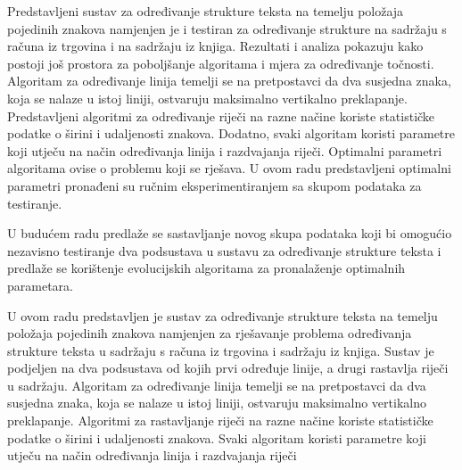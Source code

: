 \documentclass[times, utf8, zavrsni]{fer}
\begin{document}
Predstavljeni sustav za određivanje strukture teksta na temelju položaja
pojedinih znakova namjenjen je i testiran za određivanje strukture na sadržaju s
računa iz trgovina i na sadržaju iz knjiga. Rezultati i analiza pokazuju kako
postoji još prostora za poboljšanje algoritama i mjera za određivanje
točnosti. Algoritam za određivanje linija temelji se na pretpostavci da dva
susjedna znaka, koja se nalaze u istoj liniji, ostvaruju maksimalno vertikalno
preklapanje. Predstavljeni algoritmi za određivanje riječi na razne načine
koriste statističke podatke o širini i udaljenosti znakova. Dodatno,
svaki algoritam koristi parametre koji utječu na način određivanja linija i
razdvajanja riječi. Optimalni parametri algoritama ovise o problemu koji se
rješava. U ovom radu predstavljeni optimalni parametri pronađeni su ručnim
eksperimentiranjem sa skupom podataka za testiranje.

U budućem radu predlaže se sastavljanje novog skupa podataka koji bi omogućio
nezavisno testiranje dva podsustava u sustavu za određivanje strukture teksta i
predlaže se korištenje evolucijskih algoritama za pronalaženje optimalnih
parametara.




\begin{sazetak}
U ovom radu predstavljen je sustav za određivanje strukture teksta na temelju
položaja pojedinih znakova namjenjen za rješavanje problema određivanja
strukture teksta u sadržaju s računa iz trgovina i sadržaju iz knjiga. Sustav je
podjeljen na dva podsustava od kojih prvi određuje linije, a drugi rastavlja
riječi u sadržaju. Algoritam za određivanje linija temelji se na pretpostavci
da dva susjedna znaka, koja se nalaze u istoj liniji, ostvaruju maksimalno
vertikalno preklapanje. Algoritmi za rastavljanje riječi na razne načine
koriste statističke podatke o širini i udaljenosti znakova. Svaki algoritam
koristi parametre koji utječu na način određivanja linija i razdvajanja riječi


\end{sazetak}
\end{document}
